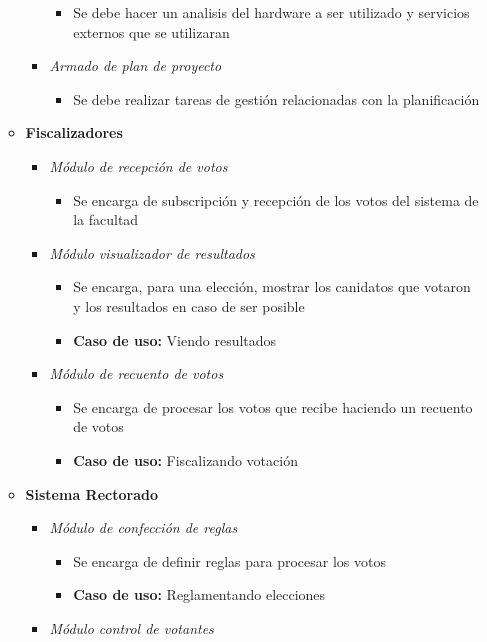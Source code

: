 \begin{itemize}
\begin{itemize}
\begin{itemize}
\begin{itemize}
 \item Se debe hacer un analisis del hardware a ser utilizado y servicios externos que se utilizaran
\end{itemize}
 \item \emph{Armado de plan de proyecto}
\begin{itemize}
 \item Se debe realizar tareas de gestión relacionadas con la planificación
\end{itemize}
\end{itemize}
 \item {\bf Fiscalizadores}
\begin{itemize}
 \item \emph{M\'odulo de recepción de votos}
\begin{itemize}
 \item Se encarga de subscripción y recepción de los votos del sistema de la facultad
\end{itemize}
 \item \emph{M\'odulo visualizador de resultados}
\begin{itemize}
 \item Se encarga, para una elección, mostrar los canidatos que votaron y los resultados en caso de ser posible
 \item {\bf Caso de uso:} Viendo resultados
\end{itemize}
 \item \emph{M\'odulo de recuento de votos}
\begin{itemize}
 \item Se encarga de procesar los votos que recibe haciendo un recuento de votos
 \item {\bf Caso de uso:} Fiscalizando votaci\'on
\end{itemize}
\end{itemize}
 \item {\bf Sistema Rectorado}
\begin{itemize}
 \item \emph{M\'odulo de confección de reglas}
\begin{itemize}
 \item Se encarga de definir reglas para procesar los votos
 \item {\bf Caso de uso:} Reglamentando elecciones
\end{itemize}
 \item \emph{M\'odulo control de votantes}
\begin{itemize}

\end{itemize}
\end{itemize}
\end{itemize}
\end{itemize}
